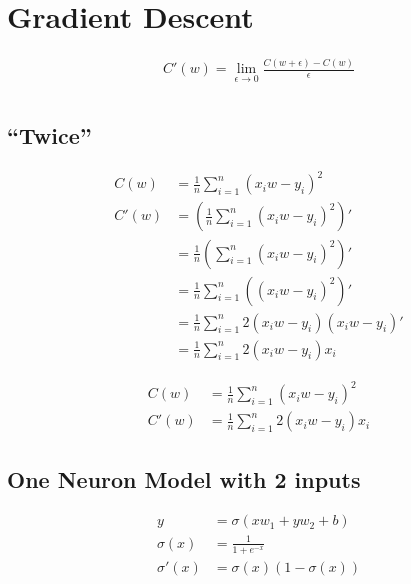 \documentclass{article}
\def \d{2}
\begin{document}
\section{Gradient Descent}

\begin{align}
  C'(w) = \lim_{\epsilon \to 0}\frac{C(w + \epsilon) - C(w)}{\epsilon} \\
\end{align}

\subsection{``Twice''}

\begin{align}
  C(w) &= \frac{1}{n}\sum_{i = 1}^{n}(x_i w - y_i)^2 \\
  C'(w) &= \left(\frac{1}{n}\sum_{i = 1}^{n}(x_i w - y_i)^2\right)' \\
        &= \frac{1}{n}\left(\sum_{i = 1}^{n}(x_i w - y_i)^2\right)' \\
        &= \frac{1}{n}\sum_{i = 1}^{n}\left((x_i w - y_i)^2\right)' \\
        &= \frac{1}{n}\sum_{i = 1}^{n}2(x_i w - y_i)\left(x_i w - y_i\right)' \\
        &= \frac{1}{n}\sum_{i = 1}^{n}2(x_i w - y_i)x_i
\end{align}

\begin{align}
  C(w) &= \frac{1}{n}\sum_{i = 1}^{n}(x_i w - y_i)^2 \\
  C'(w) &= \frac{1}{n}\sum_{i = 1}^{n}2(x_i w - y_i)x_i
\end{align}

\subsection{One Neuron Model with 2 inputs}

\begin{center}
\end{center}

\begin{align}
  y &= \sigma(xw_{1} + yw_{2} + b) \\
  \sigma(x) &= \frac{1}{1 + e^{-x}} \\
  \sigma'(x) &= \sigma(x)(1 - \sigma(x))
\end{align}
\end{document}
